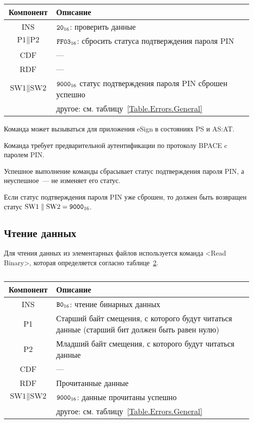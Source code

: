 \begin{table}[hbt]
\caption{}\label{Table.Oper.VerifyDeauthCmd}
\begin{tabular}{|c|p{14cm}|}
\hline
Компонент & Описание \\
\hline
\hline
INS & $\texttt{20}_{16}$: проверить данные\\
\hline
$\text{P1} \parallel \text{P2}$ & $\texttt{FF03}_{16}$: сбросить статуса подтверждения
пароля PIN  \\
\hline
CDF & ---  \\
\hline 
RDF &  --- \\
\hline
$\text{SW1} \parallel \text{SW2}$ & $\texttt{9000}_{16}$ 
статус подтверждения пароля PIN сброшен успешно\\
& другое: см. таблицу~\ref{Table.Errors.General} \\
\hline
\end{tabular}
\end{table}

Команда может вызываться для приложения eSign  
в состояниях PS и AS:AT.

Команда требует предварительной аутентификации 
по протоколу BPACE c паролем PIN.

Успешное выполнение команды сбрасывает статус подтверждения пароля PIN,
а неуспешное~--- не изменяет его статус.

Если статус подтверждения пароля PIN уже сброшен, то должен быть возвращен статус
$\text{SW1} \parallel \text{SW2} = \texttt{9000}_{16}$.

\subsection{Чтение данных}
\label{Oper.Descr.Read}

Для чтения данных из элементарных файлов 
используется команда <Read Binary>, 
которая определяется согласно 
таблице~\ref{Table.Oper.ReadCmd}.

\begin{table}[hbt]
\caption{}\label{Table.Oper.ReadCmd}
\begin{tabular}{|c|p{14cm}|}
\hline
Компонент & Описание \\
\hline
\hline
INS & $\texttt{B0}_{16}$: чтение бинарных данных \\
\hline
P1 & Старший байт смещения, с которого будут читаться данные (старший бит 
должен быть равен нулю) \\
\hline
P2 & Младший байт смещения, с которого будут читаться данные\\
\hline
CDF &  --- \\
\hline 
RDF & 	Прочитанные данные \\
\hline
$\text{SW1} \parallel\text{SW2}$ & 
$\texttt{9000}_{16}$: данные прочитаны успешно \\
& другое: см. таблицу~\ref{Table.Errors.General} \\
\hline
\end{tabular}
\end{table}

